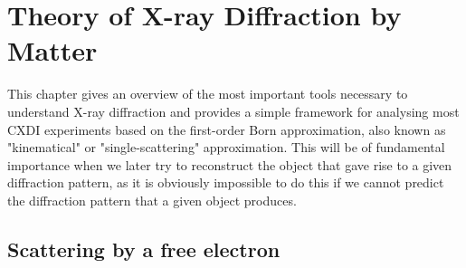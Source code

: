 \chapter{Theory of X-ray Diffraction by Matter}\label{diffraction_theory}\noindent

This chapter gives an overview of the most important tools necessary to
understand X-ray diffraction and provides a simple framework for analysing most
CXDI experiments based on the first-order Born approximation, also known as
"kinematical" or "single-scattering" approximation. This will be of fundamental
importance when we later try to reconstruct the object that gave rise to a given
diffraction pattern, as  it is obviously impossible to do this if we cannot
predict the diffraction pattern that a given object produces.

\section{Scattering by a free electron}\label{scat_free_electron}

